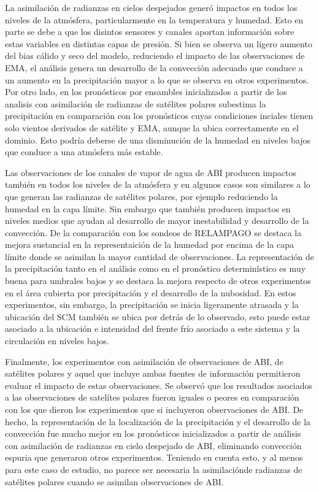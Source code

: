 \documentclass[12pt,oneside,a4paper]{reedthesis}
\begin{document}
La asimilación de radianzas en cielos despejados generó impactos en todos los niveles de la atmósfera, particularmente en la temperatura y humedad. Esto en parte se debe a que los disintos sensores y canales aportan información sobre estas variables en distintas capas de presión. Si bien se observa un ligero aumento del bias cálido y seco del modelo, reduciendo el impacto de las observaciones de EMA, el análisis genera un desarrollo de la convección adecuado que conduce a un aumento en la precipitación mayor a lo que se observa en otros experimentos. Por otro lado, en los pronósticos por ensambles inicializados a partir de los analisis con asimilación de radianzas de satélites polares subestima la precipitación en comparación con los pronósticos cuyas condiciones inciales tienen solo vientos derivados de satélite y EMA, aunque la ubica correctamente en el dominio. Esto podría deberse de una disminución de la humedad en niveles bajos que conduce a una atmósfera más estable.

Las observaciones de los canales de vapor de agua de ABI producen impactos también en todos los niveles de la atmósfera y en algunos casos son similares a lo que generan las radianzas de satélites polares, por ejemplo reduciendo la humedad en la capa límite. Sin embargo que también producen impactos en niveles medios que ayudan al desarrollo de mayor inestabilidad y desarrollo de la convección. De la comparación con los sondeos de RELAMPAGO se destaca la mejora sustancial en la representaición de la humedad por encima de la capa límite donde se asimilan la mayor cantidad de observaciones. La representación de la precipitación tanto en el análisis como en el pronóstico determinístico es muy buena para umbrales bajos y se destaca la mejora respecto de otros experimentos en el área cubierta por precipitación y el desarrollo de la nubosidad. En estos experimentos, sin embargo, la precipitación se inicia ligeramente atrasada y la ubicación del SCM también se ubica por detrás de lo observado, esto puede estar asociado a la ubicación e intensidad del frente frío asociado a este sistema y la circulación en niveles bajos.

Finalmente, los experimentos con asimilación de observaciones de ABI, de satélites polares y aquel que incluye ambas fuentes de información permitieron evaluar el impacto de estas observaciones. Se observó que los resultados asociados a las observaciones de satelítes polares fueron iguales o peores en comparación con los que dieron los experimentos que si incluyeron observaciones de ABI. De hecho, la representación de la localización de la precipitación y el desarrollo de la convección fue mucho mejor en los pronósticos inicializados a partir de análisis con asimilación de radianzas en cielo despejado de ABI, eliminando convección espuria que generaron otros experimentos. Teniendo en cuenta esto, y al menos para este caso de estudio, no parece ser necesaria la asimilaciónde radianzas de satélites polares cuando se asimilan observaciones de ABI.
\end{document}
